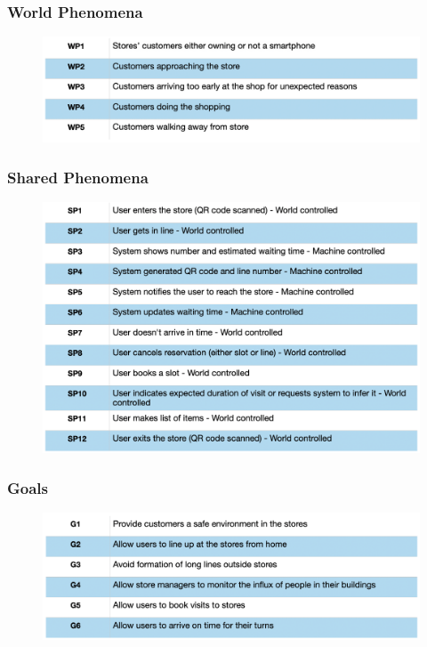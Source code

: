 \documentclass{article}
\begin{document}
\subsubsection{World Phenomena}

\begin{figure}[H]
  \includegraphics[width=\linewidth]{WorldPhenomena.png}
  
\end{figure}

\subsubsection{Shared Phenomena}

\begin{figure}[H]
  \includegraphics[width=\linewidth]{SharedPhenomena.png}
  
\end{figure}

\subsubsection{Goals}

\begin{figure}[H]
  \includegraphics[width=\linewidth]{Goals.png}
  
\end{figure}
\end{document}

